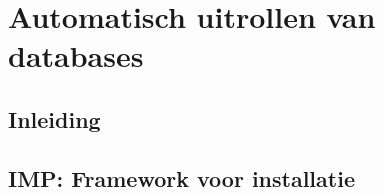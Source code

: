 \chapter{Automatisch uitrollen van databases}
\section{Inleiding}

\section{IMP: Framework voor installatie}


%